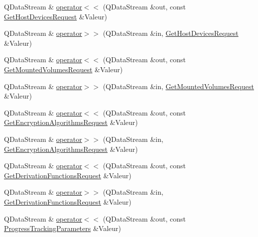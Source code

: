 \begin{DoxyCompactItemize}
\item 
Q\+Data\+Stream \& \hyperlink{namespace_gost_crypt_1_1_core_a36883f20f283a920357e910ae1124bbd}{operator$<$$<$} (Q\+Data\+Stream \&out, const \hyperlink{struct_gost_crypt_1_1_core_1_1_get_host_devices_request}{Get\+Host\+Devices\+Request} \&Valeur)
\item 
Q\+Data\+Stream \& \hyperlink{namespace_gost_crypt_1_1_core_a3b46d08975fa4cdda6093ecbed9bf751}{operator$>$$>$} (Q\+Data\+Stream \&in, \hyperlink{struct_gost_crypt_1_1_core_1_1_get_host_devices_request}{Get\+Host\+Devices\+Request} \&Valeur)
\item 
Q\+Data\+Stream \& \hyperlink{namespace_gost_crypt_1_1_core_aaf4d294548c3f9bb2946ddf7fad98a0c}{operator$<$$<$} (Q\+Data\+Stream \&out, const \hyperlink{struct_gost_crypt_1_1_core_1_1_get_mounted_volumes_request}{Get\+Mounted\+Volumes\+Request} \&Valeur)
\item 
Q\+Data\+Stream \& \hyperlink{namespace_gost_crypt_1_1_core_a1812ab8e3add353b2c0f249d0c39535d}{operator$>$$>$} (Q\+Data\+Stream \&in, \hyperlink{struct_gost_crypt_1_1_core_1_1_get_mounted_volumes_request}{Get\+Mounted\+Volumes\+Request} \&Valeur)
\item 
Q\+Data\+Stream \& \hyperlink{namespace_gost_crypt_1_1_core_adb0e3f40cef0b2dc609f318818a147ee}{operator$<$$<$} (Q\+Data\+Stream \&out, const \hyperlink{struct_gost_crypt_1_1_core_1_1_get_encryption_algorithms_request}{Get\+Encryption\+Algorithms\+Request} \&Valeur)
\item 
Q\+Data\+Stream \& \hyperlink{namespace_gost_crypt_1_1_core_aa0bb304100461cbdd2b32ba90bb6e594}{operator$>$$>$} (Q\+Data\+Stream \&in, \hyperlink{struct_gost_crypt_1_1_core_1_1_get_encryption_algorithms_request}{Get\+Encryption\+Algorithms\+Request} \&Valeur)
\item 
Q\+Data\+Stream \& \hyperlink{namespace_gost_crypt_1_1_core_adfe52f393b0b39b0dea12862d4f5d967}{operator$<$$<$} (Q\+Data\+Stream \&out, const \hyperlink{struct_gost_crypt_1_1_core_1_1_get_derivation_functions_request}{Get\+Derivation\+Functions\+Request} \&Valeur)
\item 
Q\+Data\+Stream \& \hyperlink{namespace_gost_crypt_1_1_core_a8163c06b1bf4b5cec3b93abea8926ee0}{operator$>$$>$} (Q\+Data\+Stream \&in, \hyperlink{struct_gost_crypt_1_1_core_1_1_get_derivation_functions_request}{Get\+Derivation\+Functions\+Request} \&Valeur)
\item 
Q\+Data\+Stream \& \hyperlink{namespace_gost_crypt_1_1_core_a2156b463d5c1d15655fa2fe205ae9598}{operator$<$$<$} (Q\+Data\+Stream \&out, const \hyperlink{struct_gost_crypt_1_1_core_1_1_progress_tracking_parameters}{Progress\+Tracking\+Parameters} \&Valeur)

\end{DoxyCompactItemize}
